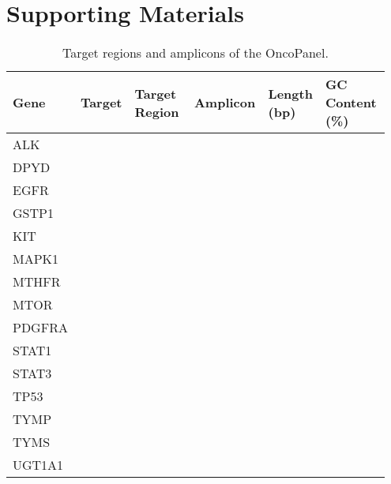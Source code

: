\chapter{Supporting Materials}


\begin{longtable}{p{0.1\linewidth}|p{0.1\linewidth}p{0.2\linewidth}p{0.2\linewidth}p{0.15\linewidth}p{0.2\linewidth}}
\caption{Target regions and amplicons of the OncoPanel.}
\label{tbl:amplicons_target_regions}
		\\
		\hline
    Gene & Target & Target Region & Amplicon & Length (bp) & GC Content (\%)
    \\
    \hline
		ALK & & & & &
    \\
		\hline
		DPYD & & & & &
    \\
    \hline
		EGFR & & & & &
    \\
		\hline
		GSTP1 & & & & &
		\\
    \hline
		KIT & & & & &
    \\
    \hline
		MAPK1 & & & & &
    \\
    \hline
		MTHFR & & & & &
    \\
    \hline
		MTOR & & & & &
    \\
    \hline
		PDGFRA & & & & &
    \\
    \hline
		STAT1 & & & & &
    \\
    \hline
		STAT3 & & & & &
    \\
		\hline
		TP53 & & & & &
    \\
    \hline
		TYMP & & & & &
		\\
		\hline
		TYMS & & & & &
		\\
		\hline
		UGT1A1 & & & & &
		\\
		\hline
\end{longtable}
